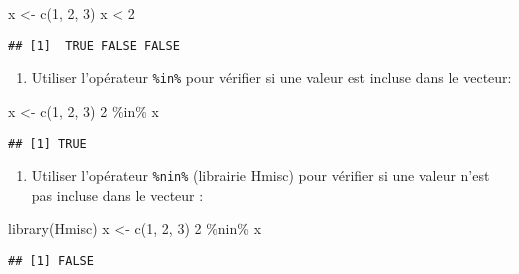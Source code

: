 \documentclass[
]{article}
\newenvironment{Shaded}{\begin{snugshade}}{\end{snugshade}}
\newcommand{\DecValTok}[1]{\textcolor[rgb]{0.00,0.00,0.81}{#1}}
\newcommand{\FunctionTok}[1]{\textcolor[rgb]{0.00,0.00,0.00}{#1}}
\newcommand{\NormalTok}[1]{#1}
\newcommand{\OtherTok}[1]{\textcolor[rgb]{0.56,0.35,0.01}{#1}}
\newcommand{\SpecialCharTok}[1]{\textcolor[rgb]{0.00,0.00,0.00}{#1}}
\providecommand{\tightlist}{%
  \setlength{\itemsep}{0pt}\setlength{\parskip}{0pt}}
\begin{document}
\begin{Shaded}
\begin{Highlighting}[]
\NormalTok{x }\OtherTok{\textless{}{-}} \FunctionTok{c}\NormalTok{(}\DecValTok{1}\NormalTok{, }\DecValTok{2}\NormalTok{, }\DecValTok{3}\NormalTok{)}
\NormalTok{x }\SpecialCharTok{\textless{}} \DecValTok{2}
\end{Highlighting}
\end{Shaded}

\begin{verbatim}
## [1]  TRUE FALSE FALSE
\end{verbatim}

\begin{enumerate}
\def\labelenumi{\arabic{enumi}.}
\setcounter{enumi}{9}
\tightlist
\item
  Utiliser l'opérateur \texttt{\%in\%} pour vérifier si une valeur est incluse dans le vecteur:
\end{enumerate}

\begin{Shaded}
\begin{Highlighting}[]
\NormalTok{x }\OtherTok{\textless{}{-}} \FunctionTok{c}\NormalTok{(}\DecValTok{1}\NormalTok{, }\DecValTok{2}\NormalTok{, }\DecValTok{3}\NormalTok{)}
\DecValTok{2} \SpecialCharTok{\%in\%}\NormalTok{ x}
\end{Highlighting}
\end{Shaded}

\begin{verbatim}
## [1] TRUE
\end{verbatim}

\begin{enumerate}
\def\labelenumi{\arabic{enumi}.}
\setcounter{enumi}{10}
\tightlist
\item
  Utiliser l'opérateur \texttt{\%nin\%} (librairie Hmisc) pour vérifier si une valeur n'est pas incluse dans le vecteur :
\end{enumerate}

\begin{Shaded}
\begin{Highlighting}[]
\FunctionTok{library}\NormalTok{(Hmisc)   }
\NormalTok{x }\OtherTok{\textless{}{-}} \FunctionTok{c}\NormalTok{(}\DecValTok{1}\NormalTok{, }\DecValTok{2}\NormalTok{, }\DecValTok{3}\NormalTok{)   }
\DecValTok{2} \SpecialCharTok{\%nin\%}\NormalTok{ x}
\end{Highlighting}
\end{Shaded}

\begin{verbatim}
## [1] FALSE
\end{verbatim}
\end{document}
